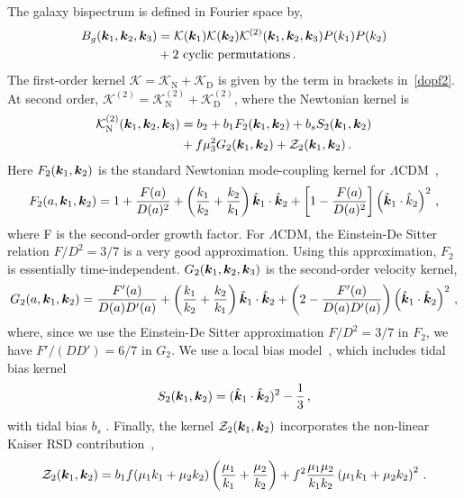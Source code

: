 The galaxy bispectrum is defined in Fourier space by,
\begin{align}
B_{g}( \bm{k}_{1},  \bm{k}_{2},  \bm {k}_3) &= { \mathcal{K}( \bm {k}_{1})\mathcal{K}({\bm {k}}_{2}) \mathcal{K}^{(2)}(  \bm{k}_{1},  \bm{k}_{2}, \bm {k}_3)}
P(k_{1})P(k_{2}) \nonumber\\ 
&+\text{2 cyclic permutations}\,.\label{eq:fsbispdef}
\end{align}
The first-order kernel $\mathcal{K}=\mathcal{K}_{\mathrm{N}}+\mathcal{K}_{\mathrm{D}}$ is given by the term in brackets in~\eqref{dopf2}.
At second order, $\mathcal{K}^{(2)}=\mathcal{K}_{\mathrm{N}}^{(2)}+\mathcal{K}_{\mathrm{D}}^{(2)}$, where
 the Newtonian kernel is~\citep{Verde:1998zr}
\begin{align}
\mathcal{K}_{\mathrm{N}}^{(2)} (\bm {k}_1,\bm {k}_2,\bm {k}_3) &= b_{2} + b_{1}F_{2}(\bm {k}_1,\bm {k}_2) + b_s S_{2}(\bm {k}_1,\bm {k}_2) \nonumber \\
& + f \mu_3^{2} G_{2}(\bm {k}_1,\bm {k}_2)
+ {\cal Z}_2(\bm {k}_1,\bm {k}_2)\,.   \label{kn2}  
\end{align}
Here $F_2(\bm {k}_1,\bm {k}_2)$ is the standard Newtonian mode-coupling kernel for $\Lambda$CDM~\citep{Villa:2015ppa}, 
\begin{equation}
    F_2(a,\bm {k}_1,\bm {k}_2) = 1 + \frac{F(a)}{D(a)^2} + \left( \frac{k_1}{k_2} + \frac{k_2}{k_1} \right) \hat{\bm {k}}_1 \cdot \hat{\bm {k}}_2 + \left[ 1 - \frac{F(a)}{D(a)^2} \right]\left( \hat{\bm {k}}_1 \cdot \hat{k}_2 \right)^2\,,
\end{equation}
where F is the second-order growth factor. For $\Lambda$CDM, the Einstein-De Sitter relation $F/D^2 = 3/7$ is a very good approximation. Using this approximation, $F_2$ is essentially time-independent. $G_2({\bm {k}_{1}},  {\bm {k}_{2}},\bm {k}_3)$ is the second-order velocity kernel, 
\begin{equation}
    G_2(a,\bm {k}_1,\bm {k}_2) = \frac{F'(a)}{D(a) D'(a)} + \left( \frac{k_1}{k_2} + \frac{k_2}{k_1} \right) \hat{\bm {k}}_1 \cdot \hat{\bm {k}}_2 + \left( 2 - \frac{F'(a)}{D(a) D'(a)} \right) \left( \hat{\bm {k}}_1 \cdot \hat{\bm {k}}_2 \right)^2\,,
\end{equation}
where, since we use the Einstein-De Sitter approximation $F/D^2 = 3/7$ in $F_2$, we have $F'/(D D') = 6/7$ in $G_2$. We use a local bias model~\citep{Desjacques:2016bnm}, which includes tidal bias kernel
\begin{equation}
    S_2(\bm {k}_1,\bm {k}_2) = (\hat{\bm {k}}_1 \cdot \hat{\bm {k}}_2)^2 - \frac{1}{3}\,, 
\end{equation}
with tidal bias $b_s$ . Finally, the kernel $\mathcal{Z}_2(\bm {k}_1,\bm {k}_2)$ incorporates the non-linear Kaiser RSD contribution~\citep{Verde:1998zr,Scoccimarro:1999ed}, 
\begin{equation}
    \mathcal{Z}_2(\bm {k}_1,\bm {k}_2) = b_1 f (\mu_1 k_1 + \mu_2 k_2) \left( \frac{\mu_1}{k_1} + \frac{\mu_2}{k_2} \right) + f^2 \frac{\mu_1 \mu_2}{k_1 k_2} \left( \mu_1 k_1 + \mu_2 k_2 \right)^2\,.
\end{equation}

